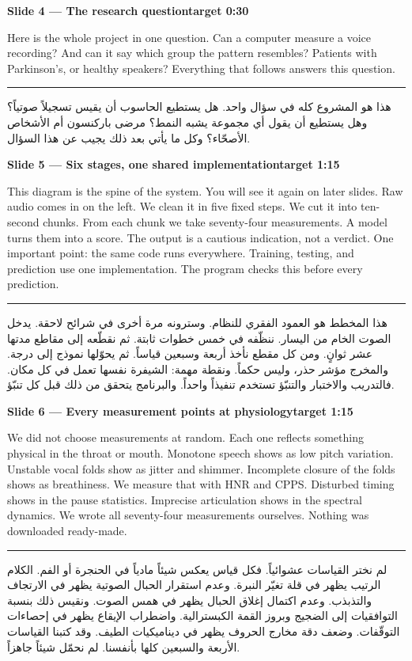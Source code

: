 \documentclass[12pt,a4paper]{article}
\newcommand{\slidehead}[2]{%
\noindent\colorbox{honest!10}{\parbox{\dimexpr\textwidth-2\fboxsep}{%
\textbf{#1}\hfill\textbf{#2}}}\par\vspace{4pt}}
\newcommand{\arstart}{\par\vspace{6pt}\hrule\vspace{6pt}}
\begin{document}
\slidehead{Slide 4 --- The research question}{target 0:30}
Here is the whole project in one question.
Can a computer measure a voice recording?
And can it say which group the pattern resembles?
Patients with Parkinson's, or healthy speakers?
Everything that follows answers this question.
\arstart
\begin{Arabic}
هذا هو المشروع كله في سؤال واحد.
هل يستطيع الحاسوب أن يقيس تسجيلاً صوتياً؟
وهل يستطيع أن يقول أي مجموعة يشبه النمط؟
مرضى باركنسون أم الأشخاص الأصحّاء؟
وكل ما يأتي بعد ذلك يجيب عن هذا السؤال.
\end{Arabic}
\clearpage

\slidehead{Slide 5 --- Six stages, one shared implementation}{target 1:15}
This diagram is the spine of the system.
You will see it again on later slides.
Raw audio comes in on the left.
We clean it in five fixed steps.
We cut it into ten-second chunks.
From each chunk we take seventy-four measurements.
A model turns them into a score.
The output is a cautious indication, not a verdict.
One important point: the same code runs everywhere.
Training, testing, and prediction use one implementation.
The program checks this before every prediction.
\arstart
\begin{Arabic}
هذا المخطط هو العمود الفقري للنظام.
وسترونه مرة أخرى في شرائح لاحقة.
يدخل الصوت الخام من اليسار.
ننظّفه في خمس خطوات ثابتة.
ثم نقطّعه إلى مقاطع مدتها عشر ثوانٍ.
ومن كل مقطع نأخذ أربعة وسبعين قياساً.
ثم يحوّلها نموذج إلى درجة.
والمخرج مؤشر حذر، وليس حكماً.
ونقطة مهمة: الشيفرة نفسها تعمل في كل مكان.
فالتدريب والاختبار والتنبّؤ تستخدم تنفيذاً واحداً.
والبرنامج يتحقق من ذلك قبل كل تنبّؤ.
\end{Arabic}
\clearpage

\slidehead{Slide 6 --- Every measurement points at physiology}{target 1:15}
We did not choose measurements at random.
Each one reflects something physical in the throat or mouth.
Monotone speech shows as low pitch variation.
Unstable vocal folds show as jitter and shimmer.
Incomplete closure of the folds shows as breathiness.
We measure that with HNR and CPPS.
Disturbed timing shows in the pause statistics.
Imprecise articulation shows in the spectral dynamics.
We wrote all seventy-four measurements ourselves.
Nothing was downloaded ready-made.
\arstart
\begin{Arabic}
لم نختر القياسات عشوائياً.
فكل قياس يعكس شيئاً مادياً في الحنجرة أو الفم.
الكلام الرتيب يظهر في قلة تغيّر النبرة.
وعدم استقرار الحبال الصوتية يظهر في الارتجاف والتذبذب.
وعدم اكتمال إغلاق الحبال يظهر في همس الصوت.
ونقيس ذلك بنسبة التوافقيات إلى الضجيج وبروز القمة الكبسترالية.
واضطراب الإيقاع يظهر في إحصاءات التوقّفات.
وضعف دقة مخارج الحروف يظهر في ديناميكيات الطيف.
وقد كتبنا القياسات الأربعة والسبعين كلها بأنفسنا.
لم نحمّل شيئاً جاهزاً.
\end{Arabic}
\clearpage
\end{document}
